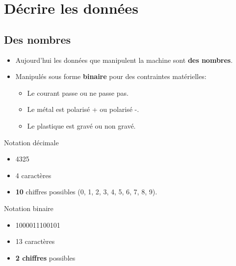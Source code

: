 \section[Décrire]{Décrire les données}
\subsection{Des nombres}

\begin{slide}
	\begin{itemize}
		\item Aujourd'hui les données que manipulent la machine sont \textbf{des nombres}.
		\item Manipulés sous forme \textbf{binaire} pour des contraintes matérielles:
			\begin{itemize}
				\item Le courant passe ou ne passe pas.
				\item Le métal est polarisé + ou polarisé -.
				\item Le plastique est gravé ou non gravé.
			\end{itemize}  
	\end{itemize}
\end{slide}

\begin{slide}
\begin{exampleblock}{Notation décimale}
  \begin{itemize}
    \item 4325
    \item 4 caractères
    \item \textbf{10} chiffres possibles (0, 1, 2, 3, 4, 5, 6, 7, 8, 9).
  \end{itemize}
\end{exampleblock}

\begin{exampleblock}{Notation binaire}
  \begin{itemize}
    \item 1000011100101
    \item 13 caractères
    \item \textbf{2 chiffres} possibles
  \end{itemize}
\end{exampleblock}

\end{slide}



